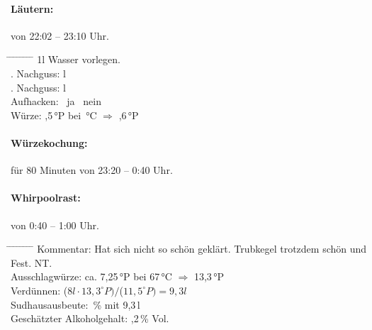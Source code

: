 \documentclass[12pt,oneside,a4paper]{scrartcl}
\begin{document}
{		\paragraph{Läutern:} von 22:02 -- 23:10 Uhr.
		\begin{tabbing}
			\hspace{1cm} \= \hspace{1cm} \= \hspace{1cm} \= \hspace{1cm} \= \hspace{1cm} \=\hspace{1cm} \=\hspace{1cm} \=\hspace{1cm} \= \kill
			\> 1l Wasser vorlegen.\\
			\> . Nachguss: \> \> 6 l\\
			\> . Nachguss: \> \> 5 l\\
			\> \> \> Aufhacken: \> \> \CheckedBox \ ja \> \> \Square \ nein\\
			\> Würze: \> \> ,5\,°P \> bei \,°C \> $\Rightarrow$ ,6\,°P\\
		\end{tabbing}
		\paragraph{Würzekochung:} für 80 Minuten von 23:20 -- 0:40 Uhr.\\
		\paragraph{Whirpoolrast:} von 0:40 -- 1:00 Uhr.
		\begin{tabbing}
			\hspace{1cm} \= \hspace{1cm} \= \hspace{1cm} \= \hspace{1cm} \= \hspace{1cm} \= \hspace{1cm} \= \hspace{1cm} \= \hspace{1cm} \= \kill
			\> Kommentar: \>\>\> Hat sich nicht so schön geklärt. Trubkegel trotzdem schön und Fest. NT.\\
			\> \> Ausschlagwürze: \> \> \> \> \> ca. 7,25\,°P bei 67\,°C $\Rightarrow$ 13,3\,°P\\
			\> \> Verdünnen: \> \> \> \> \> ($8l \cdot$$ 13,3^\circ P)/$($11,5^\circ P)= 9,3l$\\
			\> \> Sudhausausbeute: \> \> \> \> \,\% mit 9,3\,l\\
			\> \> Geschätzter Alkoholgehalt: \> \> \> \> ,2\,\% Vol.
		\end{tabbing}
}
\end{document}
